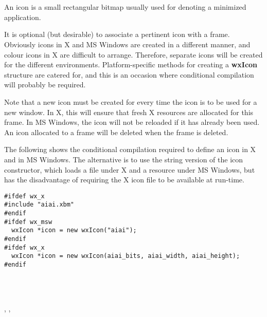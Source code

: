\section{}\label{wxicon}

An icon is a small rectangular bitmap usually used for denoting a
minimized application.


It is optional (but desirable) to associate a
pertinent icon with a frame. Obviously icons in X and MS Windows are
created in a different manner, and colour icons in X are difficult
to arrange. Therefore, separate icons will be created for the different
environments.  Platform-specific methods for creating a {\bf wxIcon}\rtfsp
structure are catered for, and this is an occasion where conditional
compilation will probably be required.

Note that a new icon must be created for every time the icon is to be
used for a new window. In X, this will ensure that fresh X resources
are allocated for this frame. In MS Windows, the icon will not be
reloaded if it has already been used. An icon allocated to a frame will
be deleted when the frame is deleted.

The following shows the conditional compilation required to define an
icon in X and in MS Windows. The alternative is to use the string
version of the icon constructor, which loads a file under X and a
resource under MS Windows, but has the disadvantage of requiring the
X icon file to be available at run-time.

\begin{verbatim}
#ifdef wx_x
#include "aiai.xbm"
#endif
#ifdef wx_msw
  wxIcon *icon = new wxIcon("aiai");
#endif
#ifdef wx_x
  wxIcon *icon = new wxIcon(aiai_bits, aiai_width, aiai_height);
#endif
\end{verbatim}


\\
\\


, , 


\label{wxiconconstr}

